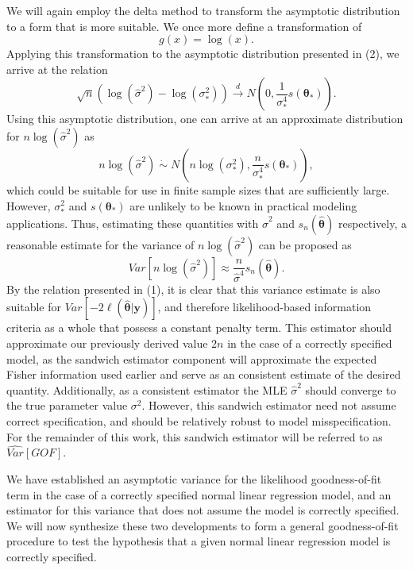 \documentclass[sn-mathphys-ay]{sn-jnl}
\begin{document}
		We will again employ the delta method to transform the asymptotic distribution to a form that is more suitable. We once more define a transformation of
		\begin{equation*}
			g(x) = \log(x) .
		\end{equation*}
		Applying this transformation to the asymptotic distribution presented in (2), we arrive at the relation
		\begin{equation*}
			\sqrt{n} ( \log (\hat{\sigma}^2) - \log(\sigma_*^2)) \xrightarrow[]{d} N \left( 0, \frac{1}{\sigma_*^4} s(\bm{\theta}_*) \right) .
		\end{equation*}
		Using this asymptotic distribution, one can arrive at an approximate distribution for $n\log(\hat{\sigma}^2)$ as
		\begin{equation*}
			n\log(\hat{\sigma}^2) \; \dot\sim \; N \left( n\log(\sigma_* ^2), \frac{n}{\sigma_*^4} s(\bm{\theta}_*) \right) ,
		\end{equation*}
		which could be suitable for use in finite sample sizes that are sufficiently large. However, $\sigma_*^2$ and $s(\bm{\theta}_*)$ are unlikely to be known in practical modeling
		applications. Thus, estimating these quantities with $\hat{\sigma}^2$ and $s_n(\hat{\bm{\theta}})$ respectively, a reasonable estimate for the variance of $n\log(\hat{\sigma}^2)$ can
		be proposed as
		\begin{equation*}
			Var \left[ n\log(\hat{\sigma}^2) \right] \approx \frac{n}{\hat{\sigma}^4} s_n(\hat{\bm{\theta}}) .
		\end{equation*}
		By the relation presented in (1), it is clear that this variance estimate is also suitable for $Var \left[ -2 \ell (\hat{\bm{\theta}} | \bm{y} ) \right]$, and therefore
		likelihood-based information criteria as a whole that possess a constant penalty term. This estimator should approximate our previously derived value $2n$ in the case of a correctly
		specified model, as the sandwich estimator component will approximate the expected Fisher information used earlier and serve as an consistent estimate of the desired quantity. Additionally, as a consistent estimator the MLE $\hat{\sigma}^2$ should converge to the true
		parameter value $\sigma^2$. However, this sandwich estimator need not assume correct specification, and should be relatively robust to model misspecification. For the remainder of this work, this sandwich estimator will be referred to as $\widehat{Var}[GOF]$.

		We have established an asymptotic variance for the likelihood goodness-of-fit term in the case of a correctly specified normal linear regression model, and an
		estimator for this variance that does not assume the model is correctly specified. We will now synthesize these two developments to form a general goodness-of-fit procedure to
		test the hypothesis that a given normal linear regression model is correctly specified.
\end{document}
